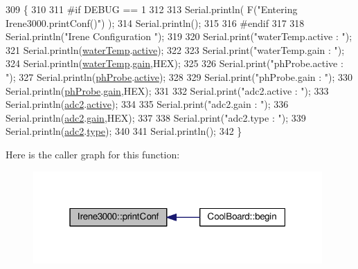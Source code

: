 \begin{DoxyCode}
309 \{
310 
311 \textcolor{preprocessor}{#if DEBUG == 1 }
312 
313     Serial.println( F(\textcolor{stringliteral}{"Entering Irene3000.printConf()"}) );
314     Serial.println();
315 
316 \textcolor{preprocessor}{#endif }
317 
318     Serial.println(\textcolor{stringliteral}{"Irene Configuration "});
319 
320     Serial.print(\textcolor{stringliteral}{"waterTemp.active : "});
321     Serial.println(\hyperlink{classIrene3000_af05612c78c758ce9db316c75ad937130}{waterTemp}.\hyperlink{structIrene3000_1_1state_af7ff649f20b9a2fb6ca0f949ee9a25ce}{active});
322 
323     Serial.print(\textcolor{stringliteral}{"waterTemp.gain : "});
324     Serial.println(\hyperlink{classIrene3000_af05612c78c758ce9db316c75ad937130}{waterTemp}.\hyperlink{structIrene3000_1_1state_a1ecf69d38cb31ecaf6b3602a3f3e93cb}{gain},HEX);    
325 
326     Serial.print(\textcolor{stringliteral}{"phProbe.active : "});
327     Serial.println(\hyperlink{classIrene3000_a997a4ee466fa1d5416e07e444965dc9e}{phProbe}.\hyperlink{structIrene3000_1_1state_af7ff649f20b9a2fb6ca0f949ee9a25ce}{active});
328 
329     Serial.print(\textcolor{stringliteral}{"phProbe.gain : "});
330     Serial.println(\hyperlink{classIrene3000_a997a4ee466fa1d5416e07e444965dc9e}{phProbe}.\hyperlink{structIrene3000_1_1state_a1ecf69d38cb31ecaf6b3602a3f3e93cb}{gain},HEX);
331     
332     Serial.print(\textcolor{stringliteral}{"adc2.active : "});
333     Serial.println(\hyperlink{classIrene3000_aae3a95a1c83c766cd2f299ce471c337e}{adc2}.\hyperlink{structIrene3000_1_1state_af7ff649f20b9a2fb6ca0f949ee9a25ce}{active});
334 
335     Serial.print(\textcolor{stringliteral}{"adc2.gain : "});
336     Serial.println(\hyperlink{classIrene3000_aae3a95a1c83c766cd2f299ce471c337e}{adc2}.\hyperlink{structIrene3000_1_1state_a1ecf69d38cb31ecaf6b3602a3f3e93cb}{gain},HEX);
337 
338     Serial.print(\textcolor{stringliteral}{"adc2.type : "});
339     Serial.println(\hyperlink{classIrene3000_aae3a95a1c83c766cd2f299ce471c337e}{adc2}.\hyperlink{structIrene3000_1_1state_a9897a7e02727db6351d44006eec73799}{type});
340 
341     Serial.println();
342 \}
\end{DoxyCode}
Here is the caller graph for this function\+:
\nopagebreak
\begin{figure}[H]
\begin{center}
\leavevmode
\includegraphics[width=313pt]{classIrene3000_a7bc2414100b5e19eacc6630fa34b2654_icgraph}
\end{center}
\end{figure}
\mbox{\label{classIrene3000_a852a170feea994ea1df01c6b245b5d9a}} 
